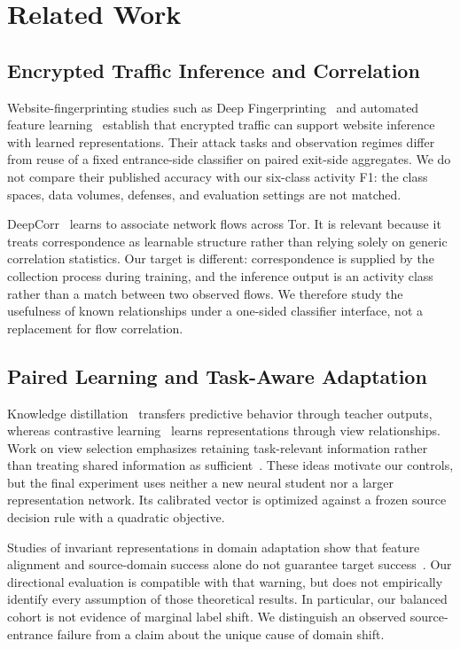 \section{Related Work}
\subsection{Encrypted Traffic Inference and Correlation}
Website-fingerprinting studies such as Deep Fingerprinting~\cite{df} and automated feature learning~\cite{automated} establish that encrypted traffic can support website inference with learned representations. Their attack tasks and observation regimes differ from reuse of a fixed entrance-side classifier on paired exit-side aggregates. We do not compare their published accuracy with our six-class activity F1: the class spaces, data volumes, defenses, and evaluation settings are not matched.

DeepCorr~\cite{deepcorr} learns to associate network flows across Tor. It is relevant because it treats correspondence as learnable structure rather than relying solely on generic correlation statistics. Our target is different: correspondence is supplied by the collection process during training, and the inference output is an activity class rather than a match between two observed flows. We therefore study the usefulness of known relationships under a one-sided classifier interface, not a replacement for flow correlation.

\subsection{Paired Learning and Task-Aware Adaptation}
Knowledge distillation~\cite{distill} transfers predictive behavior through teacher outputs, whereas contrastive learning~\cite{simclr} learns representations through view relationships. Work on view selection emphasizes retaining task-relevant information rather than treating shared information as sufficient~\cite{views}. These ideas motivate our controls, but the final experiment uses neither a new neural student nor a larger representation network. Its calibrated vector is optimized against a frozen source decision rule with a quadratic objective.

Studies of invariant representations in domain adaptation show that feature alignment and source-domain success alone do not guarantee target success~\cite{zhao}. Our directional evaluation is compatible with that warning, but does not empirically identify every assumption of those theoretical results. In particular, our balanced cohort is not evidence of marginal label shift. We distinguish an observed source-entrance failure from a claim about the unique cause of domain shift.

